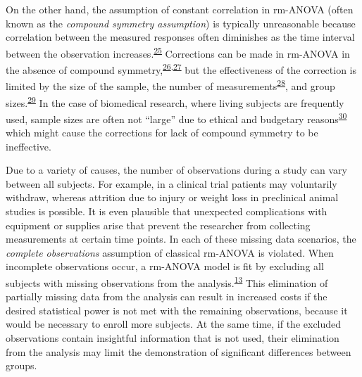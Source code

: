 \documentclass[
]{article}
\begin{document}
On the other hand, the assumption of constant correlation in rm-ANOVA (often known as the \emph{compound symmetry assumption}) is typically unreasonable because correlation between the measured responses often diminishes as the time interval between the observation increases.\textsuperscript{\protect\hyperlink{ref-ugrinowitsch2004}{25}} Corrections can be made in rm-ANOVA in the absence of compound symmetry,\textsuperscript{\protect\hyperlink{ref-huynh1976}{26},\protect\hyperlink{ref-greenhouse1959}{27}} but the effectiveness of the correction is limited by the size of the sample, the number of measurements\textsuperscript{\protect\hyperlink{ref-haverkamp2017}{28}}, and group sizes.\textsuperscript{\protect\hyperlink{ref-keselman2001}{29}} In the case of biomedical research, where living subjects are frequently used, sample sizes are often not ``large'' due to ethical and budgetary reasons\textsuperscript{\protect\hyperlink{ref-charan2013}{30}} which might cause the corrections for lack of compound symmetry to be ineffective.

Due to a variety of causes, the number of observations during a study can vary between all subjects. For example, in a clinical trial patients may voluntarily withdraw, whereas attrition due to injury or weight loss in preclinical animal studies is possible. It is even plausible that unexpected complications with equipment or supplies arise that prevent the researcher from collecting measurements at certain time points. In each of these missing data scenarios, the \emph{complete observations} assumption of classical rm-ANOVA is violated. When incomplete observations occur, a rm-ANOVA model is fit by excluding all subjects with missing observations from the analysis.\textsuperscript{\protect\hyperlink{ref-gueorguieva2004}{13}} This elimination of partially missing data from the analysis can result in increased costs if the desired statistical power is not met with the remaining observations, because it would be necessary to enroll more subjects. At the same time, if the excluded observations contain insightful information that is not used, their elimination from the analysis may limit the demonstration of significant differences between groups.
\end{document}
